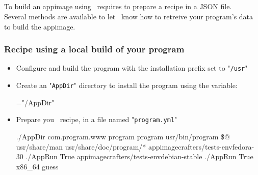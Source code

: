 \newpage
\subsection{\abuild}

To build an appimage using \abuild\ requires to prepare a recipe in a JSON file. \\
Several methods are available to let \abuild\ know how to retreive your program's data to build the appimage. 

\subsubsection*{Recipe using a local build of your program}

\begin{itemize}
\item Configure and build the program with the installation prefix set to "\texttt{/usr}"
{\footnotesize{
\begin{scripti}
  
 
\end{scripti}
}}
\item Create an "\texttt{AppDir}" directory to install the program using the  variable: 
{\footnotesize{
\begin{scripti}
  
   ="/AppDir"
\end{scripti}
}}
\item Prepare you \abuild\ recipe, in a file named "\texttt{program.yml}" 
{\footnotesize{
\begin{scripti}
 
   ./AppDir
     com.program.www
     program
     program
     
     usr/bin/program
     \$@
    \bbtt{-} usr/share/man
    \bbtt{-} usr/share/doc/program/* 
       appimagecrafters/tests-envfedora-30
       ./AppRun
       True
       appimagecrafters/tests-envdebian-stable
       ./AppRun
       True
   x86\_64
   guess
\end{scripti}
}}
\end{itemize}

